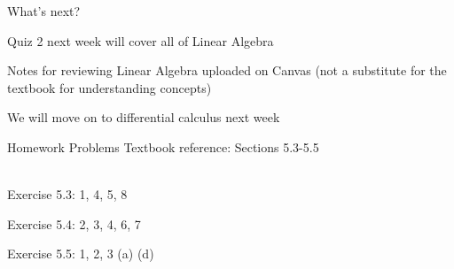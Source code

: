 \documentclass{./../../Latex/teaching_slides}
\begin{document}
 \begin{frame}{What's next?}
 \begin{witemize}
  \item Quiz 2 next week will cover all of Linear Algebra
  \item Notes for reviewing Linear Algebra uploaded on Canvas (not a substitute for the textbook for understanding concepts)
  \item We will move on to differential calculus next week
\end{witemize}
 \end{frame}
 
 \begin{frame}{Homework Problems}
 Textbook reference: Sections 5.3-5.5 \\~\
 \begin{witemize}
\item Exercise 5.3: 1, 4, 5, 8
\item Exercise 5.4: 2, 3, 4, 6, 7
  \item Exercise 5.5: 1, 2, 3 (a) (d)
\end{witemize}

\end{frame}
\end{document}
